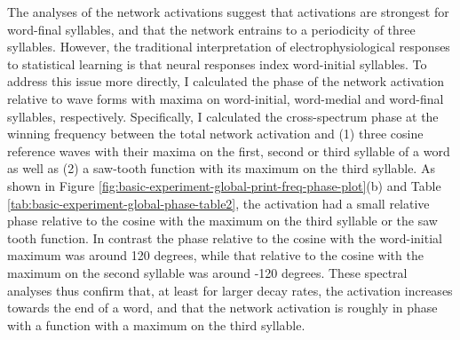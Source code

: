 \documentclass[
]{article}
\begin{document}
The analyses of the network activations suggest that activations are
strongest for word-final syllables, and that the network entrains to a
periodicity of three syllables. However, the traditional interpretation
of electrophysiological responses to statistical learning is that neural
responses index word-initial syllables. To address this issue more
directly, I calculated the phase of the network activation relative to
wave forms with maxima on word-initial, word-medial and word-final
syllables, respectively. Specifically, I calculated the cross-spectrum
phase at the winning frequency between the total network activation and
(1) three cosine reference waves with their maxima on the first, second
or third syllable of a word as well as (2) a saw-tooth function with its
maximum on the third syllable. As shown in Figure
\ref{fig:basic-experiment-global-print-freq-phase-plot}(b) and Table
\ref{tab:basic-experiment-global-phase-table2}, the activation had a
small relative phase relative to the cosine with the maximum on the
third syllable or the saw tooth function. In contrast the phase relative
to the cosine with the word-initial maximum was around 120 degrees,
while that relative to the cosine with the maximum on the second
syllable was around -120 degrees. These spectral analyses thus confirm
that, at least for larger decay rates, the activation increases towards
the end of a word, and that the network activation is roughly in phase
with a function with a maximum on the third syllable.
\end{document}
